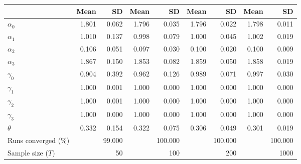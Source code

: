 
\begin{tabular}[t]{lrrrrrrrr}
\toprule
  & Mean & SD & Mean  & SD  & Mean   & SD   & Mean    & SD   \\
\midrule
$\alpha_{0}$ & 1.801 & 0.062 & 1.796 & 0.035 & 1.796 & 0.022 & 1.798 & 0.011\\
$\alpha_{1}$ & 1.010 & 0.137 & 0.998 & 0.079 & 1.000 & 0.045 & 1.002 & 0.019\\
$\alpha_{2}$ & 0.106 & 0.051 & 0.097 & 0.030 & 0.100 & 0.020 & 0.100 & 0.009\\
$\alpha_{3}$ & 1.867 & 0.150 & 1.853 & 0.082 & 1.859 & 0.050 & 1.858 & 0.019\\
$\gamma_{0}$ & 0.904 & 0.392 & 0.962 & 0.126 & 0.989 & 0.071 & 0.997 & 0.030\\
$\gamma_{1}$ & 1.000 & 0.001 & 1.000 & 0.000 & 1.000 & 0.000 & 1.000 & 0.000\\
$\gamma_{2}$ & 1.000 & 0.001 & 1.000 & 0.000 & 1.000 & 0.000 & 1.000 & 0.000\\
$\gamma_{3}$ & 1.000 & 0.000 & 1.000 & 0.000 & 1.000 & 0.000 & 1.000 & 0.000\\
$\theta$ & 0.332 & 0.154 & 0.322 & 0.075 & 0.306 & 0.049 & 0.301 & 0.019\\
Runs converged (\%) &  & 99.000 &  & 100.000 &  & 100.000 &  & 100.000\\
Sample size ($T$) &  & 50 &  & 100 &  & 200 &  & 1000\\
\bottomrule
\end{tabular}
